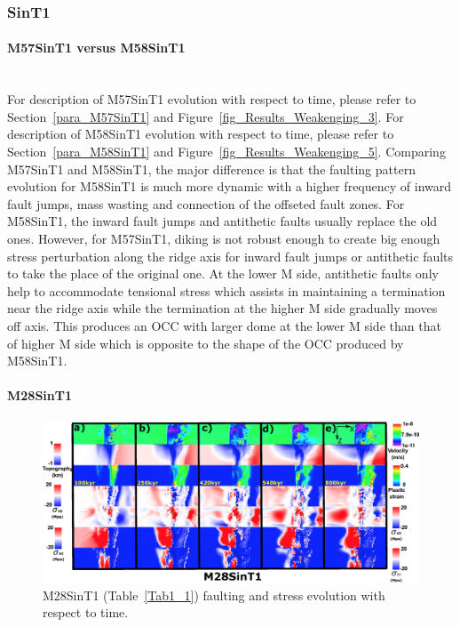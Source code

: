 \subsubsection{SinT1}

\paragraph{M57SinT1 versus M58SinT1}\label{M57SinT1 versus M58SinT1}

~\\
For description of M57SinT1 evolution with respect to time, please refer to Section~\hyperref[para_M57SinT1]{\ref{para_M57SinT1}} and Figure~\hyperref[fig_Results_Weakenging_3]{\ref{fig_Results_Weakenging_3}}. For description of M58SinT1 evolution with respect to time, please refer to  Section~\hyperref[para_M58SinT1]{\ref{para_M58SinT1}} and Figure~\hyperref[fig_Results_Weakenging_5]{\ref{fig_Results_Weakenging_5}}. Comparing M57SinT1 and M58SinT1, the major difference is that the faulting pattern evolution for M58SinT1 is much more dynamic with a higher frequency of inward fault jumps, mass wasting and connection of the offseted fault zones. For M58SinT1, the inward fault jumps and antithetic faults usually replace the old ones. However, for M57SinT1, diking is not robust enough to create big enough stress perturbation along the ridge axis for inward fault jumps or antithetic faults to take the place of the original one. At the lower M side, antithetic faults only help to accommodate tensional stress which assists in maintaining a termination near the ridge axis while the termination at the higher M side gradually moves off axis. This produces an OCC with larger dome at the lower M side than that of higher M side which is opposite to the shape of the OCC produced by M58SinT1. 

\paragraph{M28SinT1}\label{para_M28SinT1}

\begin{figure}[h]
 \centering
  \includegraphics[width=1.0\textwidth]{./Figures/fig_Results_MRange_1_M28SinT1_time_evolution.eps}
 \caption{M28SinT1 (Table~\hyperref[Tab1_1]{\ref{Tab1_1}}) faulting and stress evolution with respect to time.}
\label{fig_Results_MRange_1}
\end{figure}

